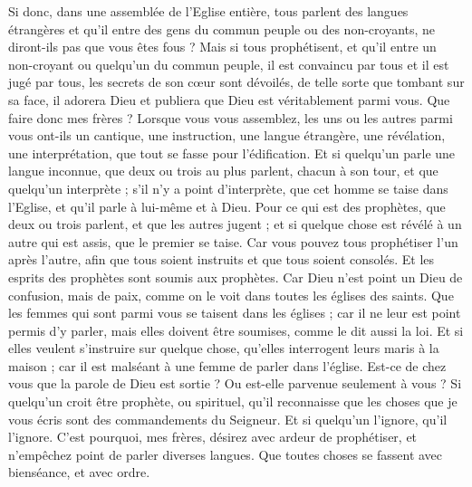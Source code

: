 \begin{multicols}{2}
Si donc, dans une assemblée de l’Eglise entière, tous parlent des langues étrangères et qu'il entre des gens du commun peuple ou des non-croyants, ne diront-ils pas que vous êtes fous ?
Mais si tous prophétisent, et qu'il entre un non-croyant ou quelqu'un du commun peuple, il est convaincu par tous et il est jugé par tous,
les secrets de son cœur sont dévoilés, de telle sorte que tombant sur sa face, il adorera Dieu et publiera que Dieu est véritablement parmi vous.
Que faire donc mes frères ? Lorsque vous vous assemblez, les uns ou les autres parmi vous ont-ils un cantique, une instruction, une langue étrangère, une révélation, une interprétation, que tout se fasse pour l'édification.
Et si quelqu'un parle une langue inconnue, que deux ou trois au plus parlent, chacun à son tour, et que quelqu’un interprète ;
s'il n'y a point d'interprète, que cet homme se taise dans l'Eglise, et qu'il parle à lui-même et à Dieu.
Pour ce qui est des prophètes, que deux ou trois parlent, et que les autres jugent ;
et si quelque chose est révélé à un autre qui est assis, que le premier se taise.
Car vous pouvez tous prophétiser l'un après l'autre, afin que tous soient instruits et que tous soient consolés.
Et les esprits des prophètes sont soumis aux prophètes.
Car Dieu n'est point un Dieu de confusion, mais de paix, comme on le voit dans toutes les églises des saints.
Que les femmes qui sont parmi vous se taisent dans les églises ; car il ne leur est point permis d’y parler, mais elles doivent être soumises, comme le dit aussi la loi.
Et si elles veulent s’instruire sur quelque chose, qu'elles interrogent leurs maris à la maison ; car il est malséant à une femme de parler dans l'église.
Est-ce de chez vous que la parole de Dieu est sortie ? Ou est-elle parvenue seulement à vous ?
Si quelqu'un croit être prophète, ou spirituel, qu'il reconnaisse que les choses que je vous écris sont des commandements du Seigneur.
Et si quelqu'un l’ignore, qu'il l’ignore.
C'est pourquoi, mes frères, désirez avec ardeur de prophétiser, et n'empêchez point de parler diverses langues.
Que toutes choses se fassent avec bienséance, et avec ordre.

\end{multicols}
